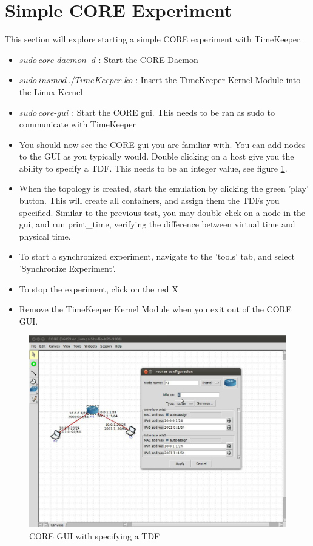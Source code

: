 \section{Simple CORE Experiment}
This section will explore starting a simple CORE experiment with TimeKeeper. 
\begin{itemize}
\item $sudo\ core$-$daemon\ $-$d$ : Start the CORE Daemon
\item $sudo\ insmod\ ./TimeKeeper.ko$ : Insert the TimeKeeper Kernel Module into the Linux Kernel
\item $sudo\ core$-$gui$ : Start the CORE gui. This needs to be ran as sudo to communicate with TimeKeeper
\item You should now see the CORE gui you are familiar with. You can add nodes to the GUI as you typically would. Double clicking on a host give you the ability to specify a TDF. This needs to be an integer value, see figure \ref{fig:coregui}.
\item When the topology is created, start the emulation by clicking the green 'play' button. This will create all containers, and assign them the TDFs you specified. Similar to the previous test, you may double click on a node in the gui, and run print\_time, verifying the difference between virtual time and physical time.
\item To start a synchronized experiment, navigate to the 'tools' tab, and select 'Synchronize Experiment'.
\item To stop the experiment, click on the red X
\item Remove the TimeKeeper Kernel Module when you exit out of the CORE GUI.
\end{itemize}
\begin{figure}[t]
      \includegraphics[width=\textwidth]{images/coregui.eps}
    \caption{CORE GUI with specifying a TDF}
    \label{fig:coregui}
  \end{figure}

